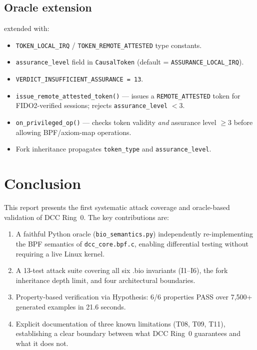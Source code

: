 \documentclass[11pt,a4paper]{article}
\theoremstyle{definition}
\begin{document}
\subsection*{Oracle extension}

 extended with:
\begin{itemize}[noitemsep]
  \item \texttt{TOKEN\_LOCAL\_IRQ} / \texttt{TOKEN\_REMOTE\_ATTESTED} type constants.
  \item \texttt{assurance\_level} field in \texttt{CausalToken} (default = \texttt{ASSURANCE\_LOCAL\_IRQ}).
  \item \texttt{VERDICT\_INSUFFICIENT\_ASSURANCE = 13}.
  \item \texttt{issue\_remote\_attested\_token()} — issues a \texttt{REMOTE\_ATTESTED}
        token for FIDO2-verified sessions; rejects \texttt{assurance\_level} $< 3$.
  \item \texttt{on\_privileged\_op()} — checks token validity \emph{and}
        assurance level $\geq 3$ before allowing BPF/axiom-map operations.
  \item Fork inheritance propagates \texttt{token\_type} and \texttt{assurance\_level}.
\end{itemize}

\section{Conclusion}

This report presents the first systematic attack coverage and oracle-based
validation of DCC Ring~0. The key contributions are:

\begin{enumerate}
  \item A faithful Python oracle (\texttt{bio\_semantics.py}) independently
        re-implementing the BPF semantics of \texttt{dcc\_core.bpf.c},
        enabling differential testing without requiring a live Linux kernel.
  \item A 13-test attack suite covering all six .bio invariants (I1–I6),
        the fork inheritance depth limit, and four architectural boundaries.
  \item Property-based verification via Hypothesis: 6/6 properties PASS over
        7,500+ generated examples in 21.6 seconds.
  \item Explicit documentation of three known limitations (T08, T09, T11),
        establishing a clear boundary between what DCC Ring~0 guarantees and
        what it does not.
\end{enumerate}
\end{document}
